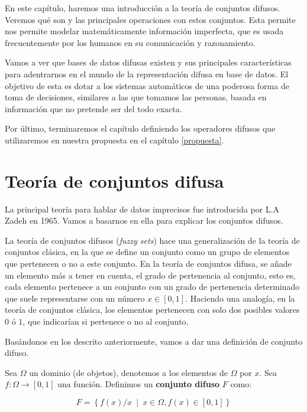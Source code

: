 En este capítulo, haremos una introducción a la teoría de conjuntos difusos. Veremos qué son y las principales operaciones con estos conjuntos. Esta permite nos permite modelar matemáticamente información imperfecta, que es usada frecuentemente por los humanos en su comunicación y razonamiento.

Vamos a ver que bases de datos difusas existen y sus principales características para adentrarnos en el mundo de la representación difusa en base de datos. El objetivo de esta es dotar a los sistemas automáticos de una poderosa forma de toma de decisiones, similares a las que tomamos las personas, basada en información que no pretende ser del todo exacta.

Por último, terminaremos el capítulo definiendo los operadores difusos que utilizaremos en nuestra propuesta en el capítulo \ref{propuesta}.

\section{Teoría de conjuntos difusa}

La principal teoría para hablar de datos imprecisos fue introducida por L.A Zadeh \cite{fuzzysetszadeh} en 1965. Vamos a basarnos en ella para explicar los conjuntos difusos.

La teoría de conjuntos difusos (\textit{fuzzy sets}) hace una generalización de la teoría de conjuntos clásica, en la que se define un conjunto como un grupo de elementos que pertenecen o no a este conjunto. En la teoría de conjuntos difusa, se añade un elemento más a tener en cuenta, el grado de pertenencia al conjunto, esto es, cada elemento pertenece a un conjunto con un grado de pertenencia determinado que suele representarse con un número $x \in [0,1]$. Haciendo una analogía, en la teoría de conjuntos clásica, los elementos pertenecen con solo dos posibles valores $0$ ó $1$, que indicarían si pertenece o no al conjunto.

Basándonos en los descrito anteriormente, vamos a dar una definición de conjunto difuso.

\begin{definition}
Sea $\Omega$ un dominio (de objetos), denotemos a los elementos de $\Omega$ por $x$. Sea $f: \Omega \longrightarrow [0,1]$ una función. Definimos un \textbf{conjunto difuso} $F$ como:

\begin{equation*}
    F = \left\{ f(x)/x \enspace | \enspace x\in\Omega, f(x) \in [0,1] \right\}
\end{equation*}
\end{definition}

